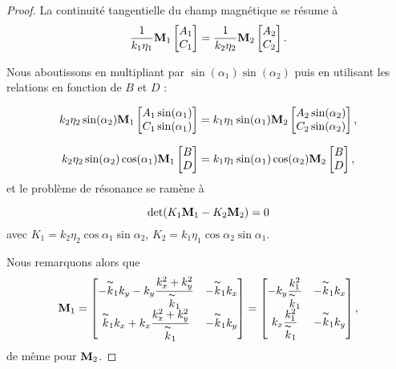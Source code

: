 \begin{proof}
    La continuité tangentielle du champ magnétique se résume à 
    \[
    \dfrac{1}{k_1\eta_1}\mathbf{M}_1\begin{bmatrix}A_1\\C_1\end{bmatrix}=\dfrac{1}{k_2\eta_2}\mathbf{M}_2\begin{bmatrix}A_2\\C_2\end{bmatrix}.
    \]

    Nous aboutissons en multipliant par \(\sin(\alpha_1)\sin(\alpha_2)\) puis en utilisant les relations en fonction de \(B\) et \(D\) :

    \[
    k_2\eta_2\sin(\alpha_2)\mathbf{M}_1\begin{bmatrix}A_1\sin(\alpha_1)\\C_1\sin(\alpha_1)\end{bmatrix}
    =
    k_1\eta_1\sin(\alpha_1)\mathbf{M}_2\begin{bmatrix}A_2\sin(\alpha_2)\\C_2\sin(\alpha_2)\end{bmatrix},
    \]

    \[
    k_2\eta_2\sin(\alpha_2)\cos(\alpha_1)\mathbf{M}_1\begin{bmatrix}B\\D\end{bmatrix}
    =
    k_1\eta_1\sin(\alpha_1)\cos(\alpha_2)\mathbf{M}_2\begin{bmatrix}B\\D\end{bmatrix},
    \]
    et le problème de résonance se ramène à 

    \[
    \operatorname{det}(K_1\mathbf{M}_1-K_2\mathbf{M}_2)=0
    \]
    avec \(K_1=k_2\eta_2\cos \alpha_1\sin \alpha_2\), \(K_2=k_1\eta_1\cos \alpha_2\sin \alpha_1\).

    Nous remarquons alors que
    \[
    \mathbf{M}_1=
    \begin{bmatrix}
    -\overset{\thicksim}{k}_1k_y-k_y\dfrac{k_x^2+k_y^2}{\overset{\thicksim}{k}_1}  &   -\overset{\thicksim}{k}_1k_x
    \\
    \overset{\thicksim}{k}_1k_x+k_x\dfrac{k_x^2+k_y^2}{\overset{\thicksim}{k}_1}   &   -\overset{\thicksim}{k}_1k_y
    \end{bmatrix}
    =
    \begin{bmatrix}
    -k_y\dfrac{k_1^2}{\overset{\thicksim}{k}_1}   &   -\overset{\thicksim}{k}_1k_x
    \\
    k_x\dfrac{k_1^2}{\overset{\thicksim}{k}_1}    &   -\overset{\thicksim}{k}_1k_y
    \end{bmatrix},
    \]
    de même pour \(\mathbf{M}_2\).


\end{proof}
